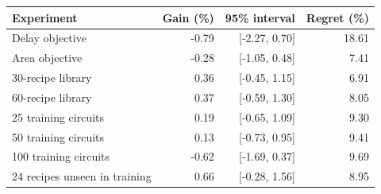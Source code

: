 \begin{tabular}{@{}lrrr@{}}
\toprule
\textbf{Experiment} & \textbf{Gain (\%)} & \textbf{95\% interval} & \textbf{Regret (\%)} \\
\midrule
Delay objective & -0.79 & [-2.27, 0.70] & 18.61 \\
Area objective & -0.28 & [-1.05, 0.48] & 7.41 \\
30-recipe library & 0.36 & [-0.45, 1.15] & 6.91 \\
60-recipe library & 0.37 & [-0.59, 1.30] & 8.05 \\
25 training circuits & 0.19 & [-0.65, 1.09] & 9.30 \\
50 training circuits & 0.13 & [-0.73, 0.95] & 9.41 \\
100 training circuits & -0.62 & [-1.69, 0.37] & 9.69 \\
24 recipes unseen in training & 0.66 & [-0.28, 1.56] & 8.95 \\
\bottomrule
\end{tabular}
